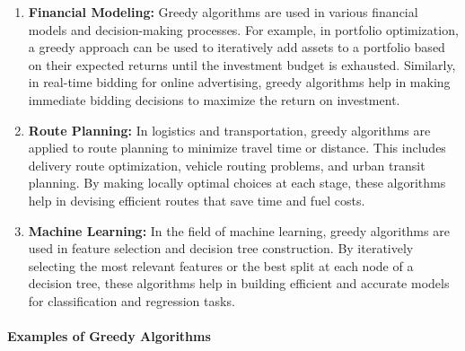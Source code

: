 \documentclass{article}
\begin{document}
\begin{enumerate}
        \item \textbf{Financial Modeling:} Greedy algorithms are used in various financial models and decision-making processes. For example, in portfolio optimization, a greedy approach can be used to iteratively add assets to a portfolio based on their expected returns until the investment budget is exhausted. Similarly, in real-time bidding for online advertising, greedy algorithms help in making immediate bidding decisions to maximize the return on investment. \cite{greedyalgorithmexamples}

        \item \textbf{Route Planning:} In logistics and transportation, greedy algorithms are applied to route planning to minimize travel time or distance. This includes delivery route optimization, vehicle routing problems, and urban transit planning. By making locally optimal choices at each stage, these algorithms help in devising efficient routes that save time and fuel costs. \cite{greedyalgorithmexamples}

        \item \textbf{Machine Learning:} In the field of machine learning, greedy algorithms are used in feature selection and decision tree construction. By iteratively selecting the most relevant features or the best split at each node of a decision tree, these algorithms help in building efficient and accurate models for classification and regression tasks. \cite{greedyalgorithmexamples}

    \end{enumerate}

    \paragraph{Examples of Greedy Algorithms}
\end{document}
